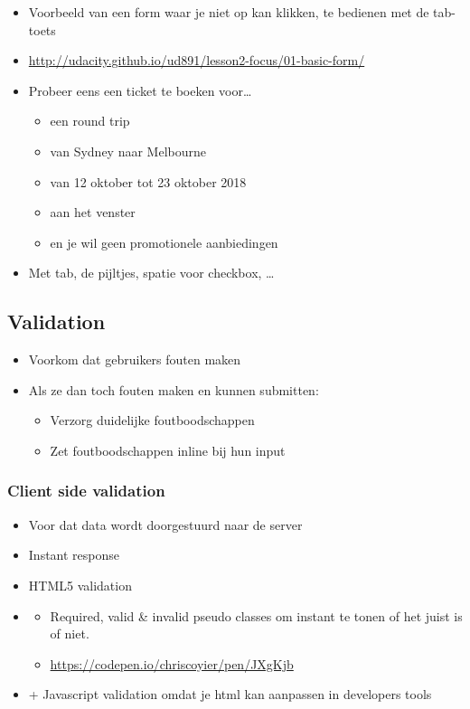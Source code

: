 \documentclass{article}
\begin{document}
\begin{itemize}
    \item Voorbeeld van een form waar je niet op kan klikken, te bedienen met de tab-toets
    \item \url{http://udacity.github.io/ud891/lesson2-focus/01-basic-form/}
    \item Probeer eens een ticket te boeken voor\dots
    \begin{itemize}
        \item een round trip
        \item van Sydney naar Melbourne
        \item van 12 oktober tot 23 oktober 2018
        \item aan het venster
        \item en je wil geen promotionele aanbiedingen
    \end{itemize}
    \item Met tab, de pijltjes, spatie voor checkbox, \dots
\end{itemize}

\subsection{Validation}

\begin{itemize}
    \item Voorkom dat gebruikers fouten maken
    \item Als ze dan toch fouten maken en kunnen submitten:
    \begin{itemize}
        \item Verzorg duidelijke foutboodschappen
        \item Zet foutboodschappen inline bij hun input
    \end{itemize} 
\end{itemize}

\subsubsection{Client side validation}
\begin{itemize}
    \item Voor dat data wordt doorgestuurd naar de server
    \item Instant response
    \item HTML5 validation
    \item \begin{itemize}
        \item Required, valid \& invalid pseudo classes om instant te tonen of het juist is of niet.
        \item \url{https://codepen.io/chriscoyier/pen/JXgKjb}
    \end{itemize}
    \item + Javascript validation omdat je html kan aanpassen in developers tools
\end{itemize}
\end{document}
